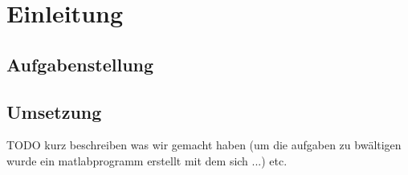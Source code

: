 \chapter{Einleitung}

\section{Aufgabenstellung}

\section{Umsetzung}
TODO kurz beschreiben was wir gemacht haben (um die aufgaben zu
bwältigen wurde ein matlabprogramm erstellt mit dem sich ...) etc.
